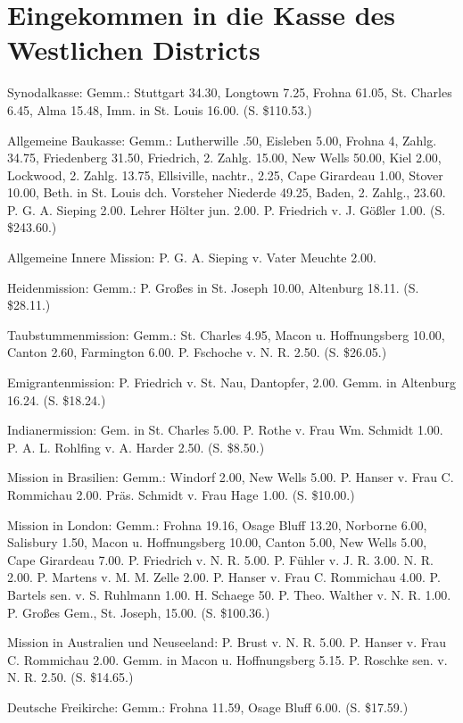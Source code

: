 \chapter[Kasse des Westlichen Districts]{Eingekommen in die Kasse des Westlichen Districts}

Synodalkasse: Gemm.: Stuttgart 34.30, Longtown 7.25, Frohna 61.05, St. Charles 6.45, Alma 15.48, Imm. in St. Louis 16.00. (S. \$110.53.)

Allgemeine Baukasse: Gemm.: Lutherwille .50, Eisleben 5.00, Frohna 4, Zahlg. 34.75, Friedenberg 31.50, Friedrich, 2. Zahlg. 15.00, New Wells 50.00, Kiel 2.00, Lockwood, 2. Zahlg. 13.75, Ellsiville, nachtr., 2.25, Cape Girardeau 1.00, Stover 10.00, Beth. in St. Louis dch. Vorsteher Niederde 49.25, Baden, 2. Zahlg., 23.60. P. G. A. Sieping 2.00. Lehrer Hölter jun. 2.00. P. Friedrich v. J. Gößler 1.00. (S. \$243.60.)

Allgemeine Innere Mission: P. G. A. Sieping v. Vater Meuchte 2.00.

Heidenmission: Gemm.: P. Großes in St. Joseph 10.00, Altenburg 18.11. (S. \$28.11.)

Taubstummenmission: Gemm.: St. Charles 4.95, Macon u. Hoffnungsberg 10.00, Canton 2.60, Farmington 6.00. P. Fschoche v. N. R. 2.50. (S. \$26.05.)

Emigrantenmission: P. Friedrich v. St. Nau, Dantopfer, 2.00. Gemm. in Altenburg 16.24. (S. \$18.24.)

Indianermission: Gem. in St. Charles 5.00. P. Rothe v. Frau Wm. Schmidt 1.00. P. A. L. Rohlfing v. A. Harder 2.50. (S. \$8.50.)

Mission in Brasilien: Gemm.: Windorf 2.00, New Wells 5.00. P. Hanser v. Frau C. Rommichau 2.00. Präs. Schmidt v. Frau Hage 1.00. (S. \$10.00.)

Mission in London: Gemm.: Frohna 19.16, Osage Bluff 13.20, Norborne 6.00, Salisbury 1.50, Macon u. Hoffnungsberg 10.00, Canton 5.00, New Wells 5.00, Cape Girardeau 7.00. P. Friedrich v. N. R. 5.00. P. Fühler v. J. R. 3.00. N. R. 2.00. P. Martens v. M. M. Zelle 2.00. P. Hanser v. Frau C. Rommichau 4.00. P. Bartels sen. v. S. Ruhlmann 1.00. H. Schaege 50. P. Theo. Walther v. N. R. 1.00. P. Großes Gem., St. Joseph, 15.00. (S. \$100.36.)

Mission in Australien und Neuseeland: P. Brust v. N. R. 5.00. P. Hanser v. Frau C. Rommichau 2.00. Gemm. in Macon u. Hoffnungsberg 5.15. P. Roschke sen. v. N. R. 2.50. (S. \$14.65.)

Deutsche Freikirche: Gemm.: Frohna 11.59, Osage Bluff 6.00. (S. \$17.59.)

